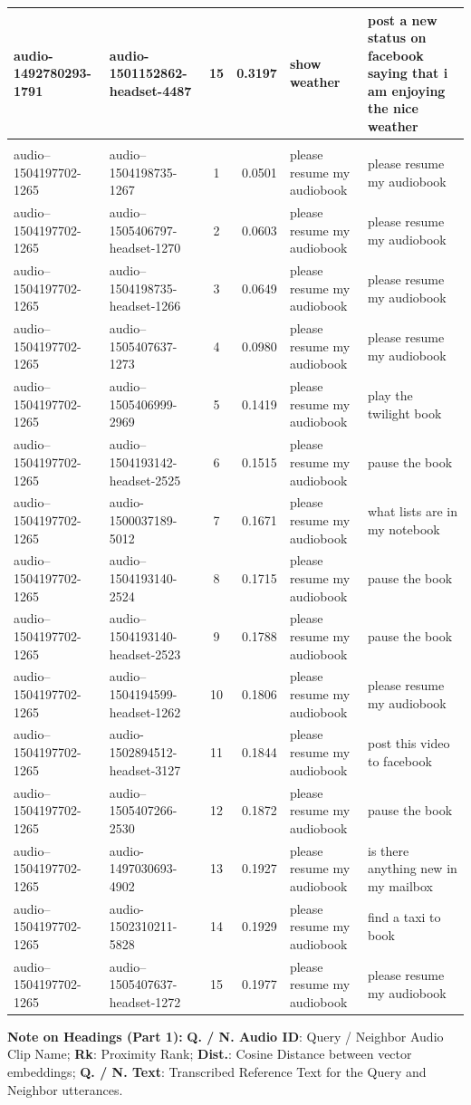 {\begin{longtable}{p{2.6cm} p{2.6cm} c r p{3.4cm} p{3.4cm}}
audio-1492780293-1791 & audio-1501152862-headset-4487 & 15 & 0.3197 & show weather & post a new status on facebook saying that i am enjoying the nice weather \\
\midrule
 &  &  &  &  & \\ %
\midrule
audio--1504197702-1265 & audio--1504198735-1267 & 1 & 0.0501 & please resume my audiobook & please resume my audiobook \\
audio--1504197702-1265 & audio--1505406797-headset-1270 & 2 & 0.0603 & please resume my audiobook & please resume my audiobook \\
audio--1504197702-1265 & audio--1504198735-headset-1266 & 3 & 0.0649 & please resume my audiobook & please resume my audiobook \\
audio--1504197702-1265 & audio--1505407637-1273 & 4 & 0.0980 & please resume my audiobook & please resume my audiobook \\
audio--1504197702-1265 & audio--1505406999-2969 & 5 & 0.1419 & please resume my audiobook & play the twilight book \\
audio--1504197702-1265 & audio--1504193142-headset-2525 & 6 & 0.1515 & please resume my audiobook & pause the book \\
audio--1504197702-1265 & audio-1500037189-5012 & 7 & 0.1671 & please resume my audiobook & what lists are in my notebook \\
audio--1504197702-1265 & audio--1504193140-2524 & 8 & 0.1715 & please resume my audiobook & pause the book \\
audio--1504197702-1265 & audio--1504193140-headset-2523 & 9 & 0.1788 & please resume my audiobook & pause the book \\
audio--1504197702-1265 & audio--1504194599-headset-1262 & 10 & 0.1806 & please resume my audiobook & please resume my audiobook \\
audio--1504197702-1265 & audio-1502894512-headset-3127 & 11 & 0.1844 & please resume my audiobook & post this video to facebook \\
audio--1504197702-1265 & audio--1505407266-2530 & 12 & 0.1872 & please resume my audiobook & pause the book \\
audio--1504197702-1265 & audio-1497030693-4902 & 13 & 0.1927 & please resume my audiobook & is there anything new in my mailbox \\
audio--1504197702-1265 & audio-1502310211-5828 & 14 & 0.1929 & please resume my audiobook & find a taxi to book \\
audio--1504197702-1265 & audio--1505407637-headset-1272 & 15 & 0.1977 & please resume my audiobook & please resume my audiobook \\
\bottomrule
\end{longtable}
}
\vspace{0.1cm}
{\footnotesize\noindent\raggedright \textbf{Note on Headings (Part 1):} \textbf{Q. / N. Audio ID}: Query / Neighbor Audio Clip Name; \textbf{Rk}: Proximity Rank; \textbf{Dist.}: Cosine Distance between vector embeddings; \textbf{Q. / N. Text}: Transcribed Reference Text for the Query and Neighbor utterances.\par}

